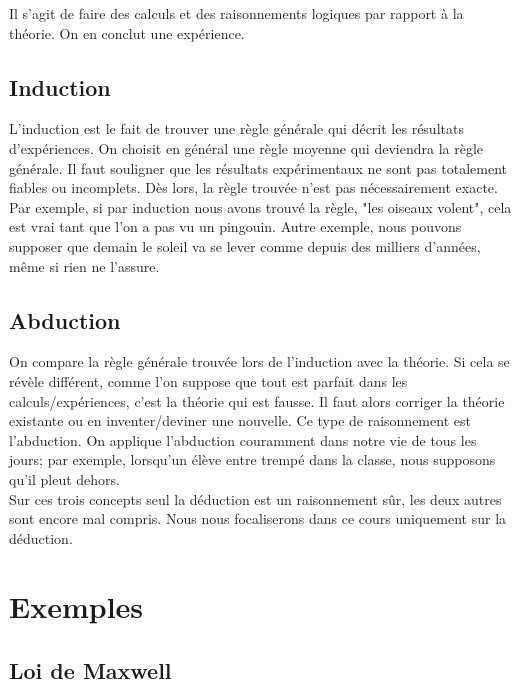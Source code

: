 Il s'agit de faire des calculs et des raisonnements logiques par rapport à la théorie. On en conclut une expérience. \\

\subsection{Induction}

L'induction est le fait de trouver une règle générale qui décrit les résultats d'expériences. On choisit en général une règle moyenne qui deviendra la règle générale.  Il faut souligner que les résultats expérimentaux ne sont pas totalement fiables ou incomplets. Dès lors, la règle trouvée n'est pas nécessairement exacte.  Par exemple, si par induction nous avons trouvé la règle, "les oiseaux volent", cela est vrai tant que l'on a pas vu un pingouin. Autre exemple, nous pouvons supposer que demain le soleil va se lever comme depuis des milliers d'années, même si rien ne l'assure.\\

\subsection{Abduction}

On compare la règle générale trouvée lors de l'induction avec la théorie. Si cela se révèle différent, comme l'on suppose que tout est parfait dans les calculs/expériences, c'est la théorie qui est fausse. Il faut alors corriger la théorie existante ou en inventer/deviner une nouvelle. Ce type de raisonnement est l'abduction. On applique l'abduction couramment dans notre vie de tous les jours; par exemple, lorsqu'un élève entre trempé dans la classe, nous supposons qu'il pleut dehors. \\


Sur ces trois concepts seul la déduction est un raisonnement sûr, les deux autres sont encore mal compris. Nous nous focaliserons dans ce cours uniquement sur la déduction. \\


\section{Exemples}

\subsection{Loi de Maxwell}

